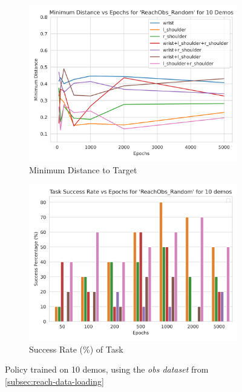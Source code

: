 \begin{figure}[htpb] %
  \centering
  \begin{subfigure}{0.45\linewidth}
    \centering
    \includegraphics[width=\linewidth]{assets/cam-comb/reach-obs/ro_random-obs-mindist-10demos.png}
    \caption{Minimum Distance to Target}\label{subfig:ro-random-obs-dist-10}
  \end{subfigure}
  \begin{subfigure}{0.45\linewidth}
    \centering
    \includegraphics[width=\linewidth]{assets/cam-comb/reach-obs/ro_random-obs-success-10demos.png}
    \caption{Success Rate (\%) of Task}\label{subfig:ro-random-obs-success-10}
  \end{subfigure}
  \caption{Policy trained on 10 demos, using the \emph{obs dataset} from \ref{subsec:reach-data-loading}}\label{fig:ro-random-obs-cams}
\end{figure}

